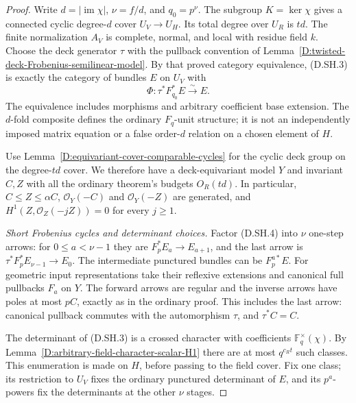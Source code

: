 \begin{proof}
Write $d=|\operatorname{im}\chi|$, $\nu=f/d$, and
$q_0=p^\nu$. The subgroup $K=\ker\chi$ gives a connected
cyclic degree-$d$ cover $U_V\to U_H$. Its total degree over
$U_R$ is $td$. The finite normalization $A_V$ is complete,
normal, and local with residue field $k$. Choose the deck
generator $\tau$ with the pullback convention of
Lemma~\ref{D:twisted-deck-Frobenius-semilinear-model}.
By that proved category equivalence, (D.SH.3) is exactly
the category of bundles $E$ on $U_V$ with
\[
              \Phi:\tau^*F_{q_0}^*E\xrightarrow{\sim}E.
                                                               \tag{D.SH.4}
\]
The equivalence includes morphisms and arbitrary coefficient
base extension. The $d$-fold composite defines the ordinary
$F_q$-unit structure; it is not an independently imposed
matrix equation or a false order-$d$ relation on a chosen
element of $H$.

Use Lemma~\ref{D:equivariant-cover-comparable-cycles} for
the cyclic deck group on the degree-$td$ cover. We therefore
have a deck-equivariant model $Y$ and invariant $C,Z$ with
all the ordinary theorem's budgets $O_R(td)$.
In particular, $C\le Z\le\alpha C$,
$\mathcal O_Y(-C)$ and $\mathcal O_Y(-Z)$ are generated,
and $H^1(Z,\mathcal O_Z(-jZ))=0$ for every $j\ge1$.

\emph{Short Frobenius cycles and determinant choices.}
Factor (D.SH.4) into $\nu$ one-step arrows: for
$0\le a<\nu-1$ they are $F_p^*E_a\to E_{a+1}$,
and the last arrow is $\tau^*F_p^*E_{\nu-1}\to E_0$.
The intermediate punctured bundles can be $F_p^{a*}E$.
For geometric input representations take their reflexive
extensions and canonical full pullbacks $F_a$ on $Y$.
The forward arrows are regular and the inverse arrows
have poles at most $pC$, exactly as in the ordinary proof.
This includes the last arrow: canonical pullback commutes
with the automorphism $\tau$, and $\tau^*C=C$.

The determinant of (D.SH.3) is a crossed character with
coefficients $\mathbb F_q^\times(\chi)$. By
Lemma~\ref{D:arbitrary-field-character-scalar-H1} there
are at most $q^{c_Rt}$ such classes. This enumeration is
made on $H$, before passing to the field cover. Fix one
class; its restriction to $U_V$ fixes the ordinary
punctured determinant of $E$, and its $p^a$-powers fix
the determinants at the other $\nu$ stages.


\end{proof}
